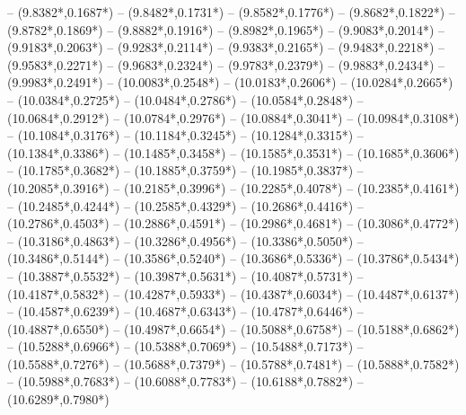 {	-- ({9.8382*\dx},{0.1687*\dy})
	-- ({9.8482*\dx},{0.1731*\dy})
	-- ({9.8582*\dx},{0.1776*\dy})
	-- ({9.8682*\dx},{0.1822*\dy})
	-- ({9.8782*\dx},{0.1869*\dy})
	-- ({9.8882*\dx},{0.1916*\dy})
	-- ({9.8982*\dx},{0.1965*\dy})
	-- ({9.9083*\dx},{0.2014*\dy})
	-- ({9.9183*\dx},{0.2063*\dy})
	-- ({9.9283*\dx},{0.2114*\dy})
	-- ({9.9383*\dx},{0.2165*\dy})
	-- ({9.9483*\dx},{0.2218*\dy})
	-- ({9.9583*\dx},{0.2271*\dy})
	-- ({9.9683*\dx},{0.2324*\dy})
	-- ({9.9783*\dx},{0.2379*\dy})
	-- ({9.9883*\dx},{0.2434*\dy})
	-- ({9.9983*\dx},{0.2491*\dy})
	-- ({10.0083*\dx},{0.2548*\dy})
	-- ({10.0183*\dx},{0.2606*\dy})
	-- ({10.0284*\dx},{0.2665*\dy})
	-- ({10.0384*\dx},{0.2725*\dy})
	-- ({10.0484*\dx},{0.2786*\dy})
	-- ({10.0584*\dx},{0.2848*\dy})
	-- ({10.0684*\dx},{0.2912*\dy})
	-- ({10.0784*\dx},{0.2976*\dy})
	-- ({10.0884*\dx},{0.3041*\dy})
	-- ({10.0984*\dx},{0.3108*\dy})
	-- ({10.1084*\dx},{0.3176*\dy})
	-- ({10.1184*\dx},{0.3245*\dy})
	-- ({10.1284*\dx},{0.3315*\dy})
	-- ({10.1384*\dx},{0.3386*\dy})
	-- ({10.1485*\dx},{0.3458*\dy})
	-- ({10.1585*\dx},{0.3531*\dy})
	-- ({10.1685*\dx},{0.3606*\dy})
	-- ({10.1785*\dx},{0.3682*\dy})
	-- ({10.1885*\dx},{0.3759*\dy})
	-- ({10.1985*\dx},{0.3837*\dy})
	-- ({10.2085*\dx},{0.3916*\dy})
	-- ({10.2185*\dx},{0.3996*\dy})
	-- ({10.2285*\dx},{0.4078*\dy})
	-- ({10.2385*\dx},{0.4161*\dy})
	-- ({10.2485*\dx},{0.4244*\dy})
	-- ({10.2585*\dx},{0.4329*\dy})
	-- ({10.2686*\dx},{0.4416*\dy})
	-- ({10.2786*\dx},{0.4503*\dy})
	-- ({10.2886*\dx},{0.4591*\dy})
	-- ({10.2986*\dx},{0.4681*\dy})
	-- ({10.3086*\dx},{0.4772*\dy})
	-- ({10.3186*\dx},{0.4863*\dy})
	-- ({10.3286*\dx},{0.4956*\dy})
	-- ({10.3386*\dx},{0.5050*\dy})
	-- ({10.3486*\dx},{0.5144*\dy})
	-- ({10.3586*\dx},{0.5240*\dy})
	-- ({10.3686*\dx},{0.5336*\dy})
	-- ({10.3786*\dx},{0.5434*\dy})
	-- ({10.3887*\dx},{0.5532*\dy})
	-- ({10.3987*\dx},{0.5631*\dy})
	-- ({10.4087*\dx},{0.5731*\dy})
	-- ({10.4187*\dx},{0.5832*\dy})
	-- ({10.4287*\dx},{0.5933*\dy})
	-- ({10.4387*\dx},{0.6034*\dy})
	-- ({10.4487*\dx},{0.6137*\dy})
	-- ({10.4587*\dx},{0.6239*\dy})
	-- ({10.4687*\dx},{0.6343*\dy})
	-- ({10.4787*\dx},{0.6446*\dy})
	-- ({10.4887*\dx},{0.6550*\dy})
	-- ({10.4987*\dx},{0.6654*\dy})
	-- ({10.5088*\dx},{0.6758*\dy})
	-- ({10.5188*\dx},{0.6862*\dy})
	-- ({10.5288*\dx},{0.6966*\dy})
	-- ({10.5388*\dx},{0.7069*\dy})
	-- ({10.5488*\dx},{0.7173*\dy})
	-- ({10.5588*\dx},{0.7276*\dy})
	-- ({10.5688*\dx},{0.7379*\dy})
	-- ({10.5788*\dx},{0.7481*\dy})
	-- ({10.5888*\dx},{0.7582*\dy})
	-- ({10.5988*\dx},{0.7683*\dy})
	-- ({10.6088*\dx},{0.7783*\dy})
	-- ({10.6188*\dx},{0.7882*\dy})
	-- ({10.6289*\dx},{0.7980*\dy})
}
